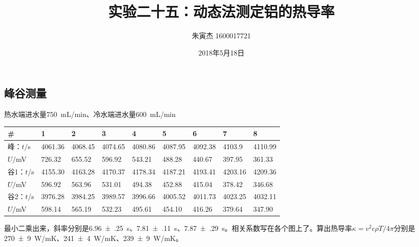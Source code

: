 \documentclass[UTF8]{ctexart}
\title{实验二十五：动态法测定铝的热导率}
\author{朱寅杰 1600017721}
\date{2018年5月18日}
\begin{document}
\maketitle
\setcounter{section}{25}

\subsection{峰谷测量}
热水端进水量\SI{750}{mL/min}、冷水端进水量\SI{600}{mL/min}
\begin{center}
\begin{tabu}{X[c,-1]|X[c,-1]X[c,-1]X[c,-1]X[c,-1]X[c,-1]X[c,-1]X[c,-1]X[c,-1]}
\hline
\#&1&2&3&4&5&6&7&8\\
\hline
峰：$t/$s&4061.36 &4068.45 &4074.65 &4080.86 &4087.95 &4092.38 &4103.9 &4110.99
\\
$U/$mV&726.32 &655.52 &596.92 &543.21 &488.28 &440.67 &397.95 &361.33
\\
\hline
谷1：$t$/s&4155.30 &4163.28 &4170.37 &4178.34 &4187.21 &4193.41 &4203.16 &4209.36
\\
$U/$mV&596.92 &563.96 &531.01 &494.38 &452.88 &415.04 &378.42 &346.68
\\
\hline
谷2：$t$/s&3976.28 &3984.25 &3989.57 &3996.66 &4005.52 &4011.73 &4023.25 &4032.11
\\
$U/$mV&598.14 &565.19 &532.23 &495.61 &454.10 &416.26 &379.64 &347.90
\\
\hline
\end{tabu}
\end{center}
最小二乘出来，斜率分别是\SI{6.96(25)}{\s}、\SI{7.81(11)}{\s}、\SI{7.87(29)}{\s}。相关系数写在各个图上了。算出热导率$\kappa=v^2c\rho T/4\pi$分别是\SI{270(9)}{W/mK}、\SI{241(4)}{W/mK}、\SI{239(9)}{W/mK}。
\end{document}
